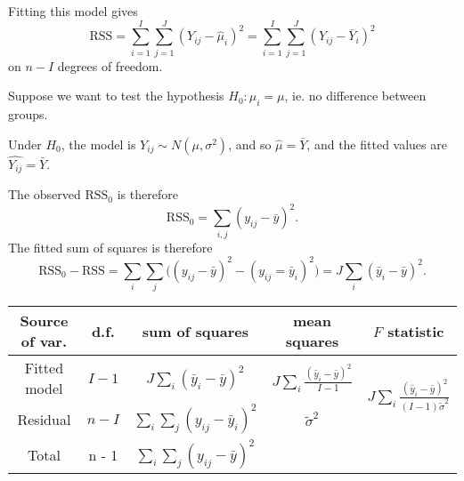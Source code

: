 \documentclass[a4paper]{article}
\begin{document}
Fitting this model gives
\[
  \mathrm{RSS} = \sum_{i = 1}^I\sum_{j = 1}^J (Y_{ij} - \hat{\mu}_i)^2 = \sum_{i = 1}^I\sum_{j = 1}^J (Y_{ij} - \bar Y_i)^2
\]
on $n - I$ degrees of freedom.

Suppose we want to test the hypothesis $H_0: \mu_i = \mu$, ie. no difference between groups.

Under $H_0$, the model is $Y_{ij} \sim N(\mu, \sigma^2)$, and so $\hat{\mu} = \bar Y$, and the fitted values are $\hat{Y_{ij}} = \bar Y$.

The observed $\mathrm{RSS}_0$ is therefore
\[
  \mathrm{RSS}_0 = \sum_{i,j} (y_{ij} - \bar y)^2.
\]
The fitted sum of squares is therefore
\[
  \mathrm{RSS}_0 - \mathrm{RSS} = \sum_i \sum_j \big((y_{ij} - \bar y)^2 - (y_{ij} = \bar y_i)^2 \big) = J\sum_i (\bar y_i - \bar y)^2.
\]
\begin{tabular}{ccccc}
  \toprule
  Source of var. & d.f. & sum of squares & mean squares & $F$ statistic\\
  \midrule
  Fitted model & $I - 1$ & $J\sum_i (\bar y_i - \bar y)^2$ & $J\sum_i \frac{(\bar y_i - \bar y)^2}{I - 1}$ & \multirow{2}{*}{$J\sum_i \frac{(\bar y_i - \bar y)^2}{(I - 1)\tilde{\sigma}^2}$} \\
  Residual & $n - I$ & $\sum_i \sum_j(y_{ij} - \bar y_i)^2$ & $\tilde{\sigma}^2$\\
  \midrule
  Total & n - 1 & $\sum_i \sum_j(y_{ij} - \bar y)^2$\\
  \bottomrule
\end{tabular}
\end{document}
